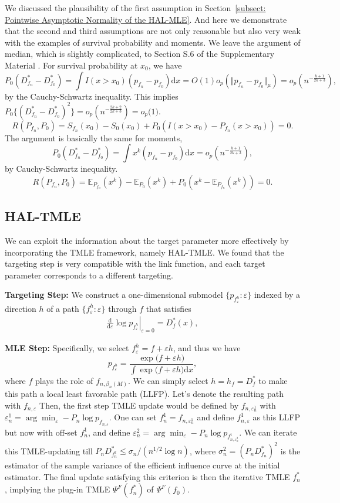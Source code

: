 We discussed the plausibility of the first assumption in Section~\ref{subsect: Pointwise Asymptotic Normality of the HAL-MLE}. And here we demonstrate that the second and third assumptions are not only reasonable but also very weak with the examples of survival probability and moments. We leave the argument of median, which is slightly complicated, to Section S.6 of the Supplementary Material \citep{hou2026supplement}. 
For survival probability at $x_0$, we have 
\[P_0{(D^*_{f_n} - D^*_{f_0})} = \int I(x>x_0)(p_{f_n} - p_{f_0}) \mathrm{d}x =O(1)o_p(\Vert p_{f_n} - p_{f_0} \Vert_{\mu}) = o_p(n^{-\frac{k+1}{2k+3}}),
\]
by the Cauchy-Schwartz inequality. This implies \(P_0\{(D^*_{f_n}-D^*_{f_0})^2\} =o_p(n^{-\frac{2k+2}{2k+3}}) = o_p\bigl(1\bigr)\). 
\[R(P_{f_n}, P_0) = S_{f_n}(x_0) - S_0(x_0) + P_0 (I(x >x_0) - P_{f_n}(x>x_0)) = 0.
\] 
The argument is basically the same for moments, \[P_0{(D^*_{f_n} - D^*_{f_0})} =\int x^k (p_{f_n} - p_{f_0}) \mathrm{d}x = o_p(n^{-\frac{k+1}{2k+3}}),\] by Cauchy-Schwartz inequality. \[R(P_{f_n}, P_0) = \mathbb{E}_{P_{f_n}}(x^k) - \mathbb{E}_{P_{0}}(x^k) + P_0 (x^k - \mathbb{E}_{P_{f_n}}(x^k)) = 0.\]


\subsection{HAL-TMLE} \label{HAL-TMLE}
We can exploit the information about the target parameter more effectively by incorporating the TMLE framework, namely HAL-TMLE. We found that the targeting step is very compatible with the link function, and each target parameter corresponds to a different targeting. 

\textbf{Targeting Step:} We construct a one-dimensional submodel $\{p_{f_{\varepsilon}^h}:\varepsilon\}$ indexed by a direction $h$ of a path $\{f_{\varepsilon}^h:\varepsilon\}$ through $f$ that satisfies
\begin{align} \label{lfm}
  \left  .  \frac{\mathrm{d}}{\mathrm{d}\varepsilon} \log p_{f_{\varepsilon}^h}\right |_{\varepsilon=0} = D^*_f(x),
\end{align}

\textbf{MLE Step:} Specifically, we select $f_{\varepsilon}^h = f + \varepsilon h$, and thus we have
\[
p_{f_{\varepsilon}^h} = \frac{\exp\bigl(f + \varepsilon h\bigr)}{\displaystyle \int \exp\bigl(f + \varepsilon h\bigr)\mathrm{d}x},
\]
where $f$ plays the role of $f_{n, \beta_n(M)}$. 
We can simply select $h=h_f=D^*_f$ to make this path a local least favorable path (LLFP). Let's denote the resulting path with $f_{n,\varepsilon}$
Then, the first step TMLE update would be defined by 
$f_{n,\varepsilon_n^1}$ with $\varepsilon_n^1=\arg\min_{\varepsilon}-P_n \log p_{f_{n,\varepsilon}}$. One can set $f_n^1=f_{n,\varepsilon_n^1}$ and define $f_{n,\varepsilon}^1$ as this LLFP but now with off-set $f_n^1$, and define $\varepsilon_n^2=\arg\min_{\varepsilon}-P_n \log p_{f_{n,\varepsilon_n^2}^1}$. We can iterate this TMLE-updating till $P_n D^*_{f_n^k}\leq \sigma_n/(n^{1/2}\log n)$, where
$\sigma_n^2 = (P_n D^*_{f_n})^2$ is the estimator of the sample variance of the efficient influence curve at the initial estimator. The final update satisfying this criterion is then the iterative TMLE $f_n^*$, implying the plug-in TMLE $\Psi^F(f_n^*)$ of $\Psi^F(f_0)$. 


